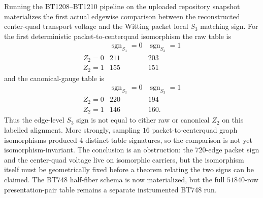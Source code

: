 
\makeatletter
{}
\makeatother
\providecommand{\PSp}{\mathrm{PSp}}
\providecommand{\Aut}{\mathrm{Aut}}
\providecommand{\spec}{\operatorname{spec}}


\begin{remark}
\label{rem:materialized-z2-s3-comparison}
Running the BT1208--BT1210 pipeline on the uploaded repository snapshot materializes
the first actual edgewise comparison between the reconstructed center-quad
transport voltage and the Witting packet local $S_3$ matching sign.  For the
first deterministic packet-to-centerquad isomorphism the raw table is
\[
\begin{array}{c|cc}
 & \operatorname{sgn}_{S_3}=0 & \operatorname{sgn}_{S_3}=1\\
\hline
Z_2=0 & 211 & 203\\
Z_2=1 & 155 & 151
\end{array}
\]
and the canonical-gauge table is
\[
\begin{array}{c|cc}
 & \operatorname{sgn}_{S_3}=0 & \operatorname{sgn}_{S_3}=1\\
\hline
Z_2=0 & 220 & 194\\
Z_2=1 & 146 & 160.
\end{array}
\]
Thus the edge-level $S_3$ sign is not equal to either raw or canonical $Z_2$ on
this labelled alignment.  More strongly, sampling $16$ packet-to-centerquad graph
isomorphisms produced $4$ distinct table signatures, so the comparison is not yet
isomorphism-invariant.  The conclusion is an obstruction: the $720$-edge packet
sign and the center-quad voltage live on isomorphic carriers, but the isomorphism
itself must be geometrically fixed before a theorem relating the two signs can be
claimed.  The BT748 half-fiber schema is now materialized, but the full
$51840$-row presentation-pair table remains a separate instrumented BT748 run.
\end{remark}
